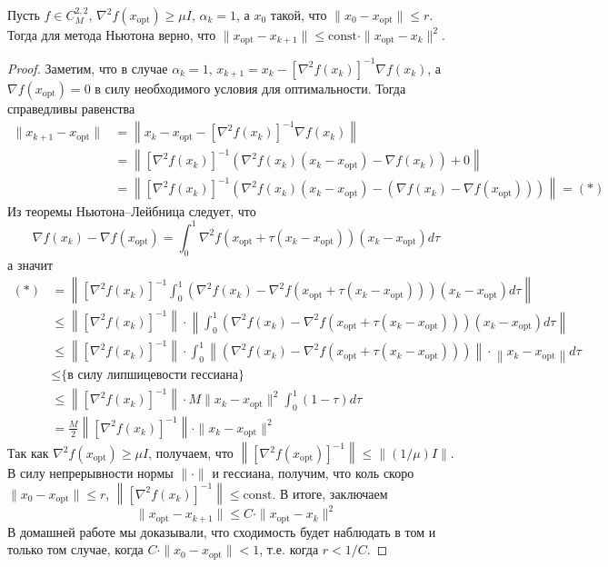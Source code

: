 \documentclass[a4paper, 12pt]{article}
\begin{document}
\begin{Statement}
Пусть $f \in C^{2,2}_M$, $\nabla^2f(x_{\mathrm{opt}}) \geq \mu I$, $\alpha_k = 1$, а $x_0$ такой, что $\|x_0 - x_{\mathrm{opt}}\| \leq r$. Тогда для метода Ньютона верно, что $\|x_{\mathrm{opt}} - x_{k+1}\| \leq \mathrm{const} \cdot \|x_{\mathrm{opt}} - x_k\|^2$.
\end{Statement}
\begin{proof}
Заметим, что в случае $\alpha_k = 1$, $x_{k+1} = x_k - \left[\nabla^2 f(x_k)\right]^{-1} \nabla f(x_k)$, а $\nabla f(x_{\mathrm{opt}}) = 0$ в силу необходимого условия для оптимальности. Тогда справедливы равенства
\begin{align}\|x_{k+1} - x_{\mathrm{opt}}\| &= \left\|x_k - x_{\mathrm{opt}} - \left[\nabla^2 f(x_k)\right]^{-1} \nabla f(x_k)\right\| \\
&= \left\|\left[\nabla^2 f(x_k)\right]^{-1} \left(\nabla^2 f(x_k)(x_k - x_{\mathrm{opt}}) -  \nabla f(x_k)\right) + 0\right\| \\
&= \left\|\left[\nabla^2 f(x_k)\right]^{-1} \left(\nabla^2 f(x_k)(x_k - x_{\mathrm{opt}}) -  (\nabla f(x_k) - \nabla f(x_{\mathrm{opt}}))\right) \right\| = (*)
\end{align}
Из теоремы Ньютона--Лейбница следует, что 
$$\nabla f(x_k) - \nabla f(x_{\mathrm{opt}}) = \int_0^1 \nabla^2 f(x_{\mathrm{opt}} + \tau (x_k - x_{\mathrm{opt}})) (x_k - x_{\mathrm{opt}}) d\tau$$
а значит 
\begin{align} (*)
&= \left\|\left[\nabla^2 f(x_k)\right]^{-1} \int_0^1 \left(\nabla^2 f(x_k) -  \nabla^2 f(x_{\mathrm{opt}} + \tau (x_k - x_{\mathrm{opt}}))\right) (x_k - x_{\mathrm{opt}}) d\tau \right\| \\
& \leq \left\|\left[\nabla^2 f(x_k)\right]^{-1} \right\| \cdot \left\|\int_0^1 \left(\nabla^2 f(x_k) -  \nabla^2 f(x_{\mathrm{opt}} + \tau (x_k - x_{\mathrm{opt}}))\right) (x_k - x_{\mathrm{opt}}) d\tau \right\| \\
& \leq \left\|\left[\nabla^2 f(x_k)\right]^{-1} \right\| \cdot \int_0^1 \left\|\left(\nabla^2 f(x_k) -  \nabla^2 f(x_{\mathrm{opt}} + \tau (x_k - x_{\mathrm{opt}}))\right) \right\| \cdot \left\|x_k - x_{\mathrm{opt}}\right\| d\tau \\
& \leq \text{\{в силу липшицевости гессиана\}} \\
& \leq \left\|\left[\nabla^2 f(x_k)\right]^{-1} \right\| \cdot M\|x_k - x_{\mathrm{opt}}\|^2 \int_0^1(1-\tau)d\tau \\ &= \frac{M}{2} \left\|\left[\nabla^2 f(x_k)\right]^{-1} \right\| \cdot \|x_k - x_{\mathrm{opt}}\|^2
\end{align}
Так как $\nabla^2f(x_{\mathrm{opt}}) \geq \mu I$, получаем, что $\left\|\left[\nabla^2 f(x_{\mathrm{opt}})\right]^{-1} \right\| \leq \left\|(1/\mu) I \right\|$. В силу непрерывности нормы $\|\cdot\|$ и гессиана, получим, что коль скоро $\|x_0 - x_{\mathrm{opt}}\| \leq r$, $\left\|\left[\nabla^2 f(x_k)\right]^{-1} \right\| \leq \mathrm{const}$. В итоге, заключаем
$$\|x_{\mathrm{opt}} - x_{k+1}\| \leq C \cdot \|x_{\mathrm{opt}} - x_k\|^2$$
В домашней работе мы доказывали, что сходимость будет наблюдать в том и только том случае, когда $C \cdot \|x_0 - x_\mathrm{opt}\| < 1$, т.е. когда $r < 1/C$.
\end{proof}
\end{document}
